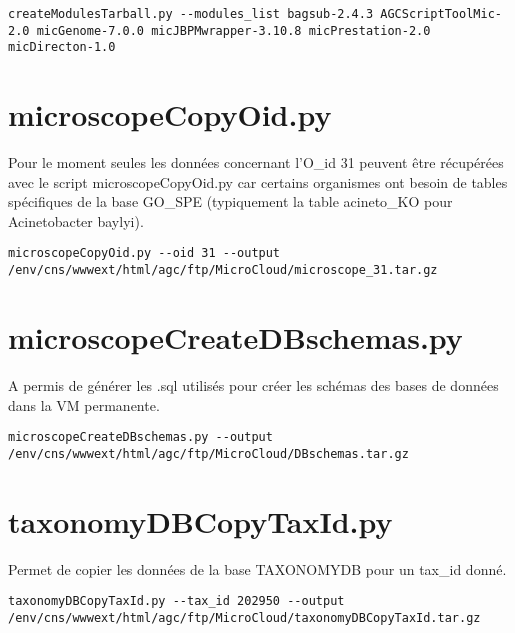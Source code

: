 \begin{lstlisting}[style=bash]
createModulesTarball.py --modules_list bagsub-2.4.3 AGCScriptToolMic-2.0 micGenome-7.0.0 micJBPMwrapper-3.10.8 micPrestation-2.0 micDirecton-1.0
\end{lstlisting}

\section{microscopeCopyOid.py}

\begin{mycolorbox}
	Pour le moment seules les données concernant l'O\_id 31 peuvent être récupérées avec le script microscopeCopyOid.py car certains organismes ont besoin de tables spécifiques de la base GO\_SPE (typiquement la table acineto\_KO pour Acinetobacter baylyi).
\end{mycolorbox}

\begin{lstlisting}[style=bash]
microscopeCopyOid.py --oid 31 --output /env/cns/wwwext/html/agc/ftp/MicroCloud/microscope_31.tar.gz
\end{lstlisting}

\section{microscopeCreateDBschemas.py}
A permis de générer les .sql utilisés pour créer les schémas des bases de données dans la VM permanente.

\begin{lstlisting}[style=bash]
microscopeCreateDBschemas.py --output /env/cns/wwwext/html/agc/ftp/MicroCloud/DBschemas.tar.gz
\end{lstlisting}

\section{taxonomyDBCopyTaxId.py}
Permet de copier les données de la base TAXONOMYDB pour un tax\_id donné.

\begin{lstlisting}[style=bash]
taxonomyDBCopyTaxId.py --tax_id 202950 --output /env/cns/wwwext/html/agc/ftp/MicroCloud/taxonomyDBCopyTaxId.tar.gz
\end{lstlisting}